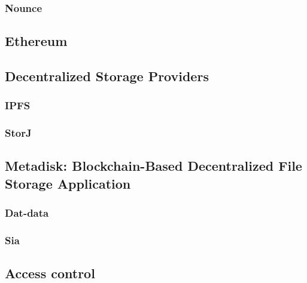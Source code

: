 \subsubsection{Nounce}

\subsection{Ethereum}

\subsection{Decentralized Storage Providers}

\subsubsection{IPFS}

\subsubsection{StorJ}
\subsection{Metadisk: Blockchain-Based Decentralized File Storage Application}

\subsubsection{Dat-data}

\subsubsection{Sia}

\subsection{Access control}


